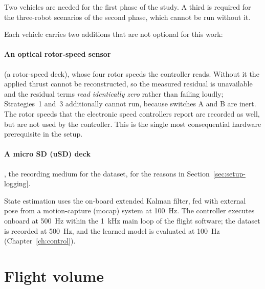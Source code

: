 Two vehicles are needed for the first phase of the study. A third is required for the three-robot
scenarios of the second phase, which cannot be run without it.

Each vehicle carries two additions that are not optional for this work:

\paragraph{An optical rotor-speed sensor} (a rotor-speed deck), whose four rotor speeds the
controller reads. Without it the applied thrust cannot be reconstructed, so the measured residual
is unavailable and the residual terms \emph{read identically zero} rather than failing loudly;
Strategies~1 and~3 additionally cannot run, because switches A and B are inert. The rotor speeds
that the electronic speed controllers report are recorded as well, but are not used by the
controller. This is the single most consequential hardware prerequisite in the setup.

\paragraph{A micro SD (uSD) deck}, the recording medium for the dataset, for the reasons in
Section~\ref{sec:setup-logging}.

State estimation uses the on-board extended Kalman filter, fed with external pose from a
motion-capture (mocap) system at \SI{100}{\hertz}. The controller executes onboard at
\SI{500}{\hertz} within the \SI{1}{\kilo\hertz} main loop of the flight software; the dataset is
recorded at \SI{500}{\hertz}, and the learned model is evaluated at \SI{100}{\hertz}
(Chapter~\ref{ch:control}).

\section{Flight volume}
\label{sec:setup-volume}

